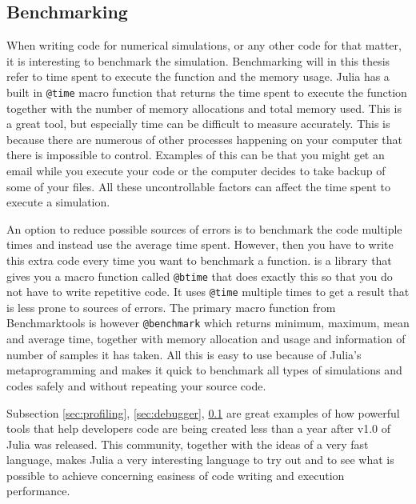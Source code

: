 \subsection{Benchmarking}
\label{sec:benchmarking}
When writing code for numerical simulations, or any other code for that matter, it is interesting to benchmark the simulation. Benchmarking will in this thesis refer to time spent to execute the function and the memory usage. Julia has a built in \texttt{@time} macro function \emph{\citep{@time}} that returns the time spent to execute the function together with the number of memory allocations and total memory used. This is a great tool, but especially time can be difficult to measure accurately. This is because there are numerous of other processes happening on your computer that there is impossible to control. Examples of this can be that you might get an email while you execute your code or the computer decides to take backup of some of your files. All these uncontrollable factors can affect the time spent to execute a simulation. 

An option to reduce possible sources of errors is to benchmark the code multiple times and instead use the average time spent. However, then you have to write this extra code every time you want to benchmark a function. \emph{\cite{BenchmarkTools}} is a library that gives you a macro function called \texttt{@btime} that does exactly this so that you do not have to write repetitive code. It uses \texttt{@time} multiple times to get a result that is less prone to sources of errors. The primary macro function from Benchmarktools is however \texttt{@benchmark} which returns minimum, maximum, mean and average time, together with memory allocation and usage and information of number of samples it has taken. All this is easy to use because of Julia's metaprogramming and makes it quick to benchmark all types of simulations and codes safely and without repeating your source code.

Subsection \ref{sec:profiling}, \ref{sec:debugger}, \ref{sec:benchmarking} are great examples of how powerful tools that help developers code are being created less than a year after v1.0 of Julia was released. This community, together with the ideas of a very fast language, makes Julia a very interesting language to try out and to see what is possible to achieve concerning easiness of code writing and execution performance.